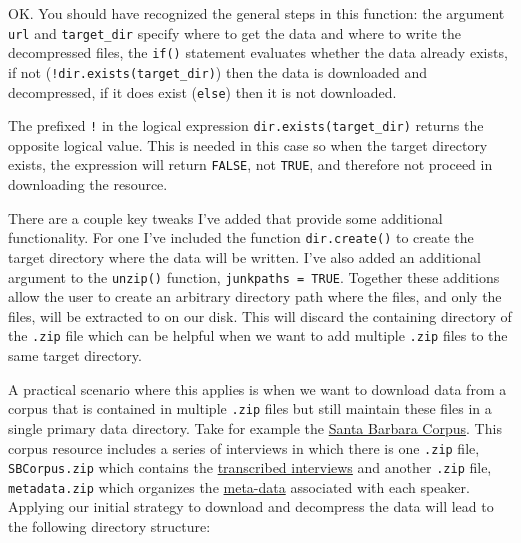 \documentclass[
  letterpaper,
]{latex/krantz}
\begin{document}
OK. You should have recognized the general steps in this function: the
argument \texttt{url} and \texttt{target\_dir} specify where to get the
data and where to write the decompressed files, the \texttt{if()}
statement evaluates whether the data already exists, if not
(\texttt{!dir.exists(target\_dir)}) then the data is downloaded and
decompressed, if it does exist (\texttt{else}) then it is not
downloaded.

\begin{tcolorbox}[enhanced jigsaw, opacitybacktitle=0.6, breakable, colframe=quarto-callout-warning-color-frame, arc=.35mm, left=2mm, leftrule=.75mm, title=\textcolor{quarto-callout-warning-color}{\faExclamationTriangle}\hspace{0.5em}{Tip}, opacityback=0, colback=white, toptitle=1mm, rightrule=.15mm, titlerule=0mm, bottomtitle=1mm, bottomrule=.15mm, coltitle=black, colbacktitle=quarto-callout-warning-color!10!white, toprule=.15mm]
The prefixed \texttt{!} in the logical expression
\texttt{dir.exists(target\_dir)} returns the opposite logical value.
This is needed in this case so when the target directory exists, the
expression will return \texttt{FALSE}, not \texttt{TRUE}, and therefore
not proceed in downloading the resource.
\end{tcolorbox}

There are a couple key tweaks I've added that provide some additional
functionality. For one I've included the function \texttt{dir.create()}
to create the target directory where the data will be written. I've also
added an additional argument to the \texttt{unzip()} function,
\texttt{junkpaths\ =\ TRUE}. Together these additions allow the user to
create an arbitrary directory path where the files, and only the files,
will be extracted to on our disk. This will discard the containing
directory of the \texttt{.zip} file which can be helpful when we want to
add multiple \texttt{.zip} files to the same target directory.

A practical scenario where this applies is when we want to download data
from a corpus that is contained in multiple \texttt{.zip} files but
still maintain these files in a single primary data directory. Take for
example the
\href{http://www.linguistics.ucsb.edu/research/santa-barbara-corpus}{Santa
Barbara Corpus}. This corpus resource includes a series of interviews in
which there is one \texttt{.zip} file, \texttt{SBCorpus.zip} which
contains the
\href{http://www.linguistics.ucsb.edu/sites/secure.lsit.ucsb.edu.ling.d7/files/sitefiles/research/SBC/SBCorpus.zip}{transcribed
interviews} and another \texttt{.zip} file, \texttt{metadata.zip} which
organizes the
\href{http://www.linguistics.ucsb.edu/sites/secure.lsit.ucsb.edu.ling.d7/files/sitefiles/research/SBC/metadata.zip}{meta-data}
associated with each speaker. Applying our initial strategy to download
and decompress the data will lead to the following directory structure:
\end{document}
